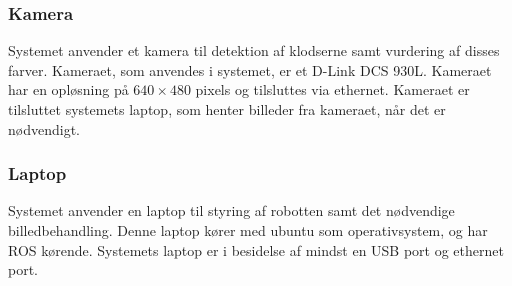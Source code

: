 \subsubsection{Kamera} %
\label{subsub:camera}

Systemet anvender et kamera til detektion af klodserne samt vurdering af disses farver.
Kameraet, som anvendes i systemet, er et D-Link DCS 930L.
Kameraet har en opløsning på $640 \times 480$ pixels og tilsluttes via ethernet.
Kameraet er tilsluttet systemets laptop, som henter billeder fra kameraet, når det er nødvendigt.


\subsubsection{Laptop} %
\label{subsub:laptop}

Systemet anvender en laptop til styring af robotten samt det nødvendige billedbehandling.
Denne laptop kører med ubuntu som operativsystem, og har ROS kørende.
Systemets laptop er i besidelse af mindst en USB port og ethernet port.


